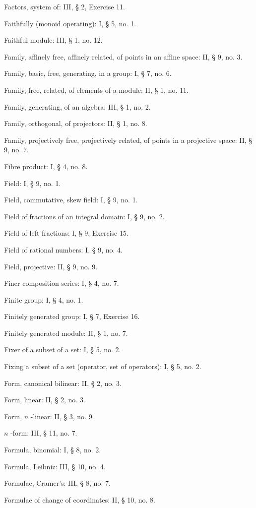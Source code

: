 Factors, system of: III, § 2, Exercise 11.

Faithfully (monoid operating): I, § 5, no. 1.

Faithful module: III, § 1, no. 12.

Family, affinely free, affinely related, of points in an affine space: II, § 9, no. 3.

Family, basic, free, generating, in a group: I, § 7, no. 6.

Family, free, related, of elements of a module: II, § 1, no. 11.

Family, generating, of an algebra: III, § 1, no. 2.

Family, orthogonal, of projectors: II, § 1, no. 8.

Family, projectively free, projectively related, of points in a projective space: II, § 9, no. 7.

Fibre product: I, § 4, no. 8.

Field: I, § 9, no. 1.

Field, commutative, skew field: I, § 9, no. 1.

Field of fractions of an integral domain: I, § 9, no. 2.

Field of left fractions: I, § 9, Exercise 15.

Field of rational numbers: I, § 9, no. 4.

Field, projective: II, § 9, no. 9.

Finer composition series: I, § 4, no. 7.

Finite group: I, § 4, no. 1.

Finitely generated group: I, § 7, Exercise 16.

Finitely generated module: II, § 1, no. 7.

Fixer of a subset of a set: I, § 5, no. 2.

Fixing a subset of a set (operator, set of operators): I, § 5, no. 2.

Form, canonical bilinear: II, § 2, no. 3.

Form, linear: II, § 2, no. 3.

Form, \(n\) -linear: II, § 3, no. 9.

\(n\) -form: III, § 11, no. 7.

Formula, binomial: I, § 8, no. 2.

Formula, Leibniz: III, § 10, no. 4.

Formulae, Cramer's: III, § 8, no. 7.

Formulae of change of coordinates: II, § 10, no. 8.

